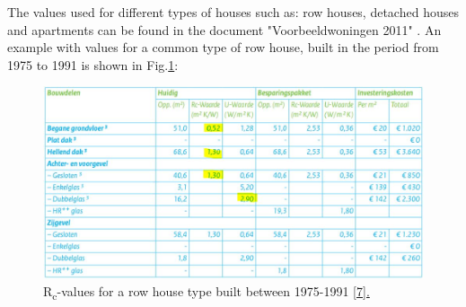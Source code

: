 The values used for different types of houses such as: row houses, detached houses and apartments can be found in the document "Voorbeeldwoningen 2011" \cite{VOORBEELD}. An example with values for a common type of row house, built in the period from 1975 to 1991 is shown in Fig.\ref{row_house}:


\begin{figure}[H]
	\centering
	\includegraphics[width=0.8\columnwidth]{Pictures/row_house_1975-1991.JPG}
	\caption[Short title]{R\textsubscript{c}-values for a row house type built between 1975-1991 \href{Voorbeeldwoningen 2011 bestaande bouw.pdf}{[7].}}
	\label{row_house}
\end{figure} 

